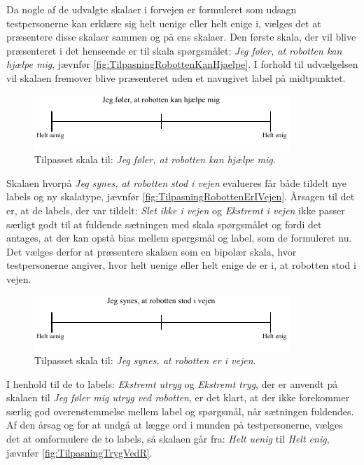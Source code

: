\noindent
%
Da nogle af de udvalgte skalaer i forvejen er formuleret som udsagn testpersonerne kan erklære sig helt uenige eller helt enige i, vælges det at præsentere disse skalaer sammen og på ens skalaer. Den første skala, der vil blive præsenteret i det henseende er til skala spørgsmålet: \textit{Jeg føler, at robotten kan hjælpe mig}, jævnfør \autoref{fig:TilpasningRobottenKanHjaelpe}. I forhold til udvælgelsen vil skalaen fremover blive præsenteret uden et navngivet label på midtpunktet. 
%
\begin{figure}[H]
\centering
\includegraphics[width =\textwidth]{Figure/TilpasningAfSkalaer/TilpassetRobottenKanHjaelpe} 
\caption{Tilpasset skala til: \textit{Jeg føler, at robotten kan hjælpe mig}.}
\label{fig:TilpasningRobottenKanHjaelpe}
\end{figure}
\noindent
% 
Skalaen hvorpå \textit{Jeg synes, at robotten stod i vejen} evalueres får både tildelt nye labels og ny skalatype, jævnfør \autoref{fig:TilpasningRobottenErIVejen}. Årsagen til det er, at de labels, der var tildelt: \textit{Slet ikke i vejen} og \textit{Ekstremt i vejen} ikke passer særligt godt til at fuldende sætningen med skala spørgsmålet og fordi det antages, at der kan opstå bias mellem spørgsmål og label, som de formuleret nu. Det vælges derfor at præsentere skalaen som en bipolær skala, hvor testpersonerne angiver, hvor helt uenige eller helt enige de er i, at robotten stod i vejen.
%
\begin{figure}[H]
\centering
\includegraphics[width =\textwidth]{Figure/TilpasningAfSkalaer/TilpassetRobottenErIVejen} 
\caption{Tilpasset skala til: \textit{Jeg synes, at robotten er i vejen}.}
\label{fig:TilpasningRobottenErIVejen}
\end{figure}
\noindent
%
I henhold til de to labels: \textit{Ekstremt utryg} og \textit{Ekstremt tryg}, der er anvendt på skalaen til \textit{Jeg føler mig utryg ved robotten}, er det klart, at der ikke forekommer særlig god overenstemmelse mellem label og spørgsmål, når sætningen fuldendes. Af den årsag og for at undgå at lægge ord i munden på testpersonerne, vælges det at omformulere de to labels, så skalaen går fra: \textit{Helt uenig} til \textit{Helt enig}, jævnfør \autoref{fig:TilpasningTrygVedR}.
